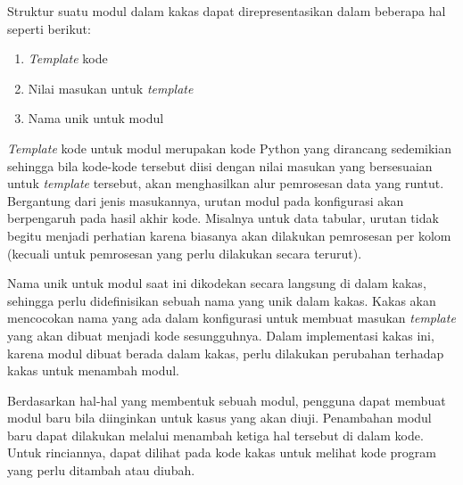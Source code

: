 Struktur suatu modul dalam kakas dapat direpresentasikan dalam beberapa hal seperti berikut:
\begin{enumerate}
    \item \textit{Template} kode
    \item Nilai masukan untuk \textit{template}
    \item Nama unik untuk modul
\end{enumerate}

\textit{Template} kode untuk modul merupakan kode Python yang dirancang sedemikian sehingga bila kode-kode tersebut diisi dengan nilai masukan yang bersesuaian untuk \textit{template} tersebut, akan menghasilkan alur pemrosesan data yang runtut.
Bergantung dari jenis masukannya, urutan modul pada konfigurasi akan berpengaruh pada hasil akhir kode.
Misalnya untuk data tabular, urutan tidak begitu menjadi perhatian karena biasanya akan dilakukan pemrosesan per kolom (kecuali untuk pemrosesan yang perlu dilakukan secara terurut).

Nama unik untuk modul saat ini dikodekan secara langsung di dalam kakas, sehingga perlu didefinisikan sebuah nama yang unik dalam kakas.
Kakas akan mencocokan nama yang ada dalam konfigurasi untuk membuat masukan \textit{template} yang akan dibuat menjadi kode sesungguhnya.
Dalam implementasi kakas ini, karena modul dibuat berada dalam kakas, perlu dilakukan perubahan terhadap kakas untuk menambah modul.

Berdasarkan hal-hal yang membentuk sebuah modul, pengguna dapat membuat modul baru bila diinginkan untuk kasus yang akan diuji.
Penambahan modul baru dapat dilakukan melalui menambah ketiga hal tersebut di dalam kode.
Untuk rinciannya, dapat dilihat pada kode kakas untuk melihat kode program yang perlu ditambah atau diubah.

